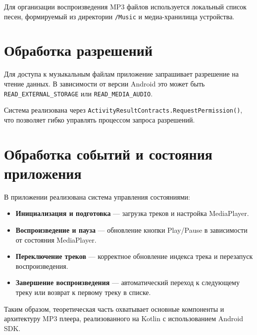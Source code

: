 Для организации воспроизведения MP3 файлов используется локальный список песен, формируемый из директории \texttt{/Music} и медиа-хранилища устройства.

\section{Обработка разрешений}

Для доступа к музыкальным файлам приложение запрашивает разрешение на чтение данных. В зависимости от версии Android это может быть \texttt{READ\_EXTERNAL\_STORAGE} или \texttt{READ\_MEDIA\_AUDIO}.  

Система реализована через \texttt{ActivityResultContracts.RequestPermission()}, что позволяет гибко управлять процессом запроса разрешений.

\section{Обработка событий и состояния приложения}

В приложении реализована система управления состояниями:

\begin{itemize}
    \item \textbf{Инициализация и подготовка} — загрузка треков и настройка MediaPlayer.
    \item \textbf{Воспроизведение и пауза} — обновление кнопки Play/Pause в зависимости от состояния MediaPlayer.
    \item \textbf{Переключение треков} — корректное обновление индекса трека и перезапуск воспроизведения.
    \item \textbf{Завершение воспроизведения} — автоматический переход к следующему треку или возврат к первому треку в списке.
\end{itemize}

Таким образом, теоретическая часть охватывает основные компоненты и архитектуру MP3 плеера, реализованного на Kotlin с использованием Android SDK.

